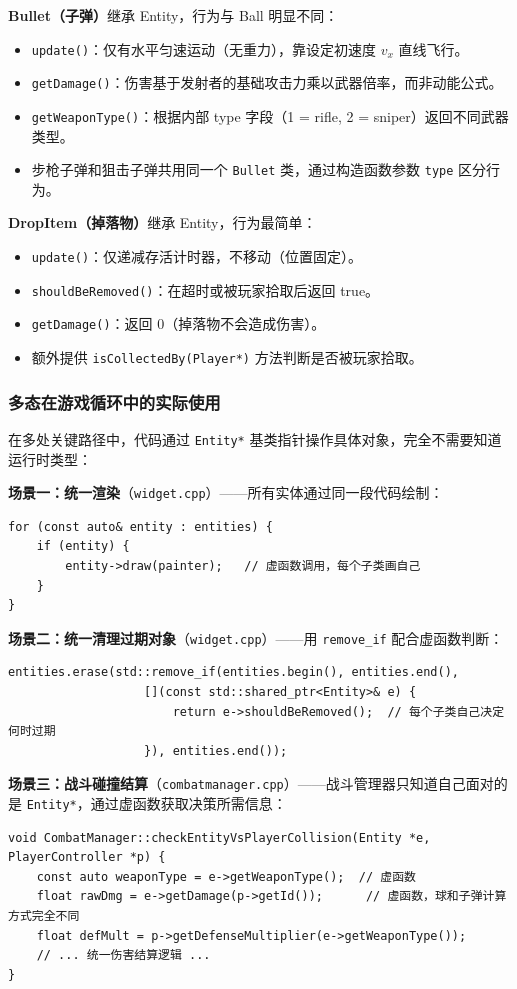 \documentclass[utf8]{ctexart}
\begin{document}
\textbf{Bullet（子弹）}继承 Entity，行为与 Ball 明显不同：
\begin{itemize}
  \item \texttt{update()}：仅有水平匀速运动（无重力），靠设定初速度 $v_x$ 直线飞行。
  \item \texttt{getDamage()}：伤害基于发射者的基础攻击力乘以武器倍率，而非动能公式。
  \item \texttt{getWeaponType()}：根据内部 type 字段（1 = rifle, 2 = sniper）返回不同武器类型。
  \item 步枪子弹和狙击子弹共用同一个 \texttt{Bullet} 类，通过构造函数参数 \texttt{type} 区分行为。
\end{itemize}

\textbf{DropItem（掉落物）}继承 Entity，行为最简单：
\begin{itemize}
  \item \texttt{update()}：仅递减存活计时器，不移动（位置固定）。
  \item \texttt{shouldBeRemoved()}：在超时或被玩家拾取后返回 true。
  \item \texttt{getDamage()}：返回 0（掉落物不会造成伤害）。
  \item 额外提供 \texttt{isCollectedBy(Player*)} 方法判断是否被玩家拾取。
\end{itemize}

\subsubsection{多态在游戏循环中的实际使用}

在多处关键路径中，代码通过 \texttt{Entity*} 基类指针操作具体对象，完全不需要知道运行时类型：

\textbf{场景一：统一渲染}（\texttt{widget.cpp}）——所有实体通过同一段代码绘制：
\begin{verbatim}
for (const auto& entity : entities) {
    if (entity) {
        entity->draw(painter);   // 虚函数调用，每个子类画自己
    }
}
\end{verbatim}

\textbf{场景二：统一清理过期对象}（\texttt{widget.cpp}）——用 \texttt{remove\_if} 配合虚函数判断：
\begin{verbatim}
entities.erase(std::remove_if(entities.begin(), entities.end(),
                   [](const std::shared_ptr<Entity>& e) {
                       return e->shouldBeRemoved();  // 每个子类自己决定何时过期
                   }), entities.end());
\end{verbatim}

\textbf{场景三：战斗碰撞结算}（\texttt{combatmanager.cpp}）——战斗管理器只知道自己面对的是 \texttt{Entity*}，通过虚函数获取决策所需信息：
\begin{verbatim}
void CombatManager::checkEntityVsPlayerCollision(Entity *e, PlayerController *p) {
    const auto weaponType = e->getWeaponType();  // 虚函数
    float rawDmg = e->getDamage(p->getId());      // 虚函数，球和子弹计算方式完全不同
    float defMult = p->getDefenseMultiplier(e->getWeaponType());
    // ... 统一伤害结算逻辑 ...
}
\end{verbatim}
\end{document}
